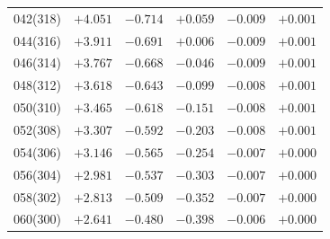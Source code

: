 \begin{table}[!h]
\begin{tabular}{rrrrrr}
042(318) & $+4.051$ & $-0.714$ & $+0.059$ & $-0.009$ & $+0.001$ \\ 
044(316) & $+3.911$ & $-0.691$ & $+0.006$ & $-0.009$ & $+0.001$ \\ 
046(314) & $+3.767$ & $-0.668$ & $-0.046$ & $-0.009$ & $+0.001$ \\ 
048(312) & $+3.618$ & $-0.643$ & $-0.099$ & $-0.008$ & $+0.001$ \\ 
050(310) & $+3.465$ & $-0.618$ & $-0.151$ & $-0.008$ & $+0.001$ \\
052(308) & $+3.307$ & $-0.592$ & $-0.203$ & $-0.008$ & $+0.001$ \\ 
054(306) & $+3.146$ & $-0.565$ & $-0.254$ & $-0.007$ & $+0.000$ \\ 
056(304) & $+2.981$ & $-0.537$ & $-0.303$ & $-0.007$ & $+0.000$ \\ 
058(302) & $+2.813$ & $-0.509$ & $-0.352$ & $-0.007$ & $+0.000$ \\ 
060(300) & $+2.641$ & $-0.480$ & $-0.398$ & $-0.006$ & $+0.000$ \\ 
\end{tabular}
\end{table}

